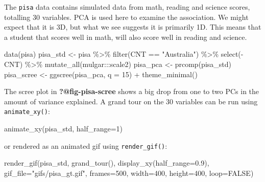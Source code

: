 \documentclass[
  letterpaper,
]{krantz}
\newenvironment{Shaded}{\begin{snugshade}}{\end{snugshade}}
\newcommand{\AttributeTok}[1]{\textcolor[rgb]{0.40,0.45,0.13}{#1}}
\newcommand{\ConstantTok}[1]{\textcolor[rgb]{0.56,0.35,0.01}{#1}}
\newcommand{\DecValTok}[1]{\textcolor[rgb]{0.68,0.00,0.00}{#1}}
\newcommand{\FloatTok}[1]{\textcolor[rgb]{0.68,0.00,0.00}{#1}}
\newcommand{\FunctionTok}[1]{\textcolor[rgb]{0.28,0.35,0.67}{#1}}
\newcommand{\NormalTok}[1]{\textcolor[rgb]{0.00,0.23,0.31}{#1}}
\newcommand{\OtherTok}[1]{\textcolor[rgb]{0.00,0.23,0.31}{#1}}
\newcommand{\SpecialCharTok}[1]{\textcolor[rgb]{0.37,0.37,0.37}{#1}}
\newcommand{\StringTok}[1]{\textcolor[rgb]{0.13,0.47,0.30}{#1}}
\begin{document}
The \texttt{pisa} data contains simulated data from math, reading and
science scores, totalling 30 variables. PCA is used here to examine the
association. We might expect that it is 3D, but what we see suggests it
is primarily 1D. This means that a student that scores well in math,
will also score well in reading and science.

\begin{Shaded}
\begin{Highlighting}[]
\FunctionTok{data}\NormalTok{(pisa)}
\NormalTok{pisa\_std }\OtherTok{\textless{}{-}}\NormalTok{ pisa }\SpecialCharTok{\%\textgreater{}\%}
  \FunctionTok{filter}\NormalTok{(CNT }\SpecialCharTok{==} \StringTok{"Australia"}\NormalTok{) }\SpecialCharTok{\%\textgreater{}\%}
  \FunctionTok{select}\NormalTok{(}\SpecialCharTok{{-}}\NormalTok{CNT) }\SpecialCharTok{\%\textgreater{}\%}
  \FunctionTok{mutate\_all}\NormalTok{(mulgar}\SpecialCharTok{:::}\NormalTok{scale2)}
\NormalTok{pisa\_pca }\OtherTok{\textless{}{-}} \FunctionTok{prcomp}\NormalTok{(pisa\_std)}
\NormalTok{pisa\_scree }\OtherTok{\textless{}{-}} \FunctionTok{ggscree}\NormalTok{(pisa\_pca, }\AttributeTok{q =} \DecValTok{15}\NormalTok{) }\SpecialCharTok{+} \FunctionTok{theme\_minimal}\NormalTok{()}
\end{Highlighting}
\end{Shaded}

The scree plot in \textbf{?@fig-pisa-scree} shows a big drop from one to
two PCs in the amount of variance explained. A grand tour on the 30
variables can be run using \texttt{animate\_xy()}:

\begin{Shaded}
\begin{Highlighting}[]
\FunctionTok{animate\_xy}\NormalTok{(pisa\_std, }\AttributeTok{half\_range=}\DecValTok{1}\NormalTok{)}
\end{Highlighting}
\end{Shaded}

or rendered as an animated gif using \texttt{render\_gif()}:

\begin{Shaded}
\begin{Highlighting}[]
\FunctionTok{render\_gif}\NormalTok{(pisa\_std, }
           \FunctionTok{grand\_tour}\NormalTok{(), }
           \FunctionTok{display\_xy}\NormalTok{(}\AttributeTok{half\_range=}\FloatTok{0.9}\NormalTok{),}
           \AttributeTok{gif\_file=}\StringTok{"gifs/pisa\_gt.gif"}\NormalTok{,}
           \AttributeTok{frames=}\DecValTok{500}\NormalTok{,}
           \AttributeTok{width=}\DecValTok{400}\NormalTok{,}
           \AttributeTok{height=}\DecValTok{400}\NormalTok{,}
           \AttributeTok{loop=}\ConstantTok{FALSE}\NormalTok{)}
\end{Highlighting}
\end{Shaded}
\end{document}
